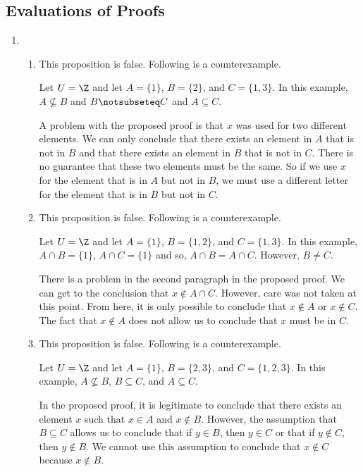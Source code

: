 \subsection*{Evaluations of Proofs}
\setcounter{oldenumi}{\theenumi}
\begin{enumerate} \setcounter{enumi}{\theoldenumi}
\item \begin{enumerate}
\item This proposition is false.  Following is a counterexample.

\noindent
Let $U = \Z$ and let $A = \{1 \}$, $B = \{2 \}$, and $C = \{1, 3\}$.  In this example, 
$A \not \subseteq B$ and $B \notsubseteq C$ and $A \subseteq C$.

\vskip6pt
\noindent
A problem with the proposed proof is that $x$ was used for two different elements.  We can only conclude that there exists an element in $A$ that is not in $B$ and that there exists an element in $B$ that is not in $C$.  There is no guarantee that these two elements must be the same.  So if we use $x$ for the element that is in $A$ but not in $B$, we must use a different letter for the element that is in $B$ but not in $C$.

\item This proposition is false.  Following is a counterexample.

\noindent
Let $U = \Z$ and let $A = \{1 \}$, $B = \{1, 2 \}$, and $C = \{1, 3\}$.  In this example, 
$A \cap B = \{1 \}$, $A \cap C = \{1 \}$ and so, $A \cap B = A \cap C$.  However, $B \ne C$.

\noindent
There is a problem in the second paragraph in the proposed proof.  We can get to the conclusion that $x \notin A \cap C$.  However, care was not taken at this point.  From here, it is only possible to conclude that $x \notin A$ or $x \notin C$.  The fact that $x \notin A$ does not allow us to conclude that $x$ must be in $C$.


\item This proposition is false.  Following is a counterexample.

\noindent
Let $U = \Z$ and let $A = \{1 \}$, $B = \{2, 3 \}$, and $C = \{1, 2, 3\}$.  In this example, 
$A \not \subseteq B$, $B \subseteq C$, and $A \subseteq C$.

\vskip6pt
\noindent
In the proposed proof, it is legitimate to conclude that there exists an element $x$ such that 
$x \in A$ and $x \notin B$.  However, the assumption that $B \subseteq C$ allows us to conclude that if $y \in B$, then $y \in C$ or that if $y \notin C$, then $y \notin B$.  We cannot use this assumption to conclude that $x \notin C$ because $x \notin B$.
\end{enumerate}
\end{enumerate}



